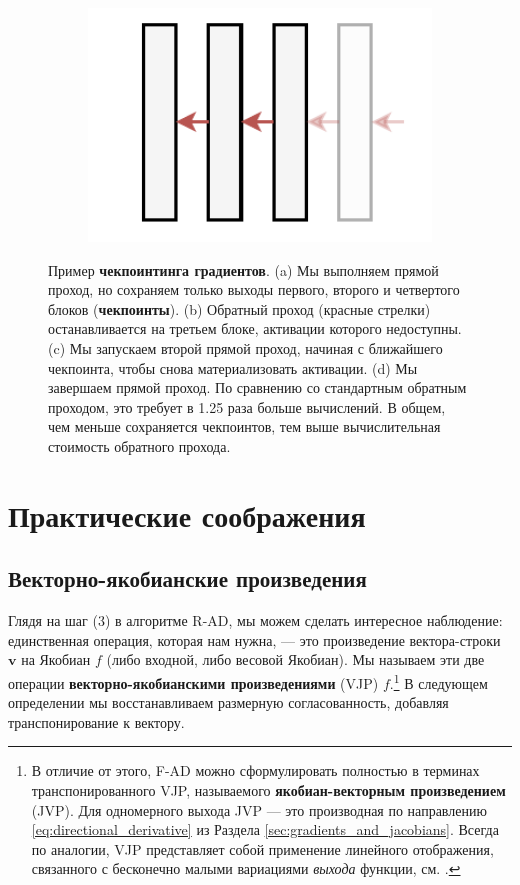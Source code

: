 \begin{figure}
\begin{subfigure}[b]{0.23\textwidth}
    \caption{}
    \end{subfigure}
    \hfill
    \begin{subfigure}[b]{0.23\textwidth}
    \includegraphics[width=1.0\textwidth]{images/gradient_checkpointing-Pagina-4}
    \caption{}
    \end{subfigure}
    \hfill
    \caption{Пример \textbf{чекпоинтинга градиентов}. (a) Мы выполняем прямой проход, но сохраняем только выходы первого, второго и четвертого блоков (\textbf{чекпоинты}). (b) Обратный проход (красные стрелки) останавливается на третьем блоке, активации которого недоступны. (c) Мы запускаем второй прямой проход, начиная с ближайшего чекпоинта, чтобы снова материализовать активации. (d) Мы завершаем прямой проход. По сравнению со стандартным обратным проходом, это требует в 1.25 раза больше вычислений. В общем, чем меньше сохраняется чекпоинтов, тем выше вычислительная стоимость обратного прохода.}
    \label{fig:gradient_checkpointing}
\end{figure}

\section{Практические соображения}

\subsection{Векторно-якобианские произведения}

Глядя на шаг (3) в алгоритме R-AD, мы можем сделать интересное наблюдение: единственная операция, которая нам нужна, — это произведение вектора-строки $\mathbf{v}$ на Якобиан $f$ (либо входной, либо весовой Якобиан). Мы называем эти две операции \textbf{векторно-якобианскими произведениями} (VJP) $f$.\footnote{В отличие от этого, F-AD можно сформулировать полностью в терминах транспонированного VJP, называемого \textbf{якобиан-векторным произведением} (JVP). Для одномерного выхода JVP — это производная по направлению \eqref{eq:directional_derivative} из Раздела \ref{sec:gradients_and_jacobians}. Всегда по аналогии, VJP представляет собой применение линейного отображения, связанного с бесконечно малыми вариациями \textit{выхода} функции, см. \cite{blondel2024elements}.} В следующем определении мы восстанавливаем размерную согласованность, добавляя транспонирование к вектору.

